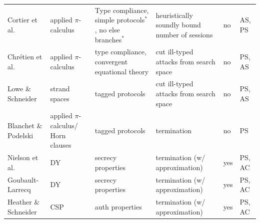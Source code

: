 \begin{table}[h!]
\begin{tabular}{|p{2cm}|p{1.8cm}p{2.6cm}p{2.8cm}p{1.72cm}p{2.6cm}|}
\hhline{|======|}

\rowcolor{groupthreeDark}
 Cortier et al. \cite{bound_sessions} & applied \newline $\pi$-calculus & Type compliance, simple protocols$^*$, no else branches$^*$  & heuristically soundly bound number of sessions & no & AS, PS \\

\rowcolor{groupthreeLight}
  Chrétien et al. \cite{typing_for_free} & applied \newline $\pi$-calculus & type compliance, convergent \newline equational theory & cut ill-typed \newline attacks from search space & no & PS, AS \\

\rowcolor{groupthreeDark}
   Lowe \& Schneider \cite{tagging} & strand spaces & tagged protocols & cut ill-typed \newline attacks from search space & no & PS, AS \\

\rowcolor{groupthreeLight}
   Blanchet \& Podelski \cite{tagging_enforces_termination} & applied $\pi$-calculus/ Horn clauses & tagged protocols & termination & no & PS \\


\hhline{|======|}

\rowcolor{groupfourDark}
Nielson et al. \cite{cubic_time} & DY & secrecy properties & termination \newline (w/ approximation)  & yes & PS, AC \\

\rowcolor{groupfourLight}
Goubault-Larrecq \cite{ai_1} & DY & secrecy properties & termination \newline (w/ approximation) & yes & PS, AC \\

\rowcolor{groupfourDark}
Heather \& Schneider \cite{ai_2} & CSP & auth properties  & termination \newline (w/ approximation) & yes & PS, AC \\

 \hline



\end{tabular}
\end{table}
